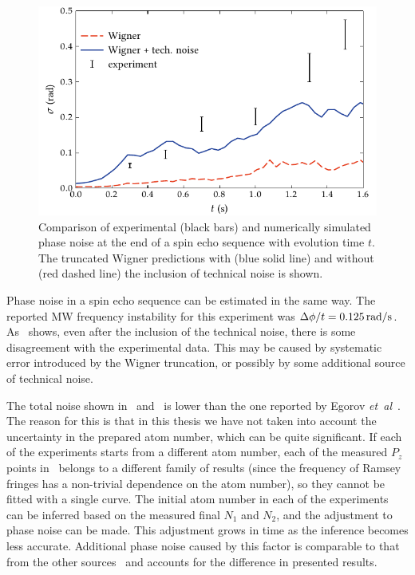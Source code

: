 \begin{figure}
    \centerline{\includegraphics{figures_generated/bec_noise/echo_noise.pdf}}

    \caption[Experimental and numerically simulated phase noise in spin echo sequence]{
    Comparison of experimental (black bars) and numerically simulated phase noise at the end of a spin echo sequence with evolution time $t$.
    The truncated Wigner predictions with (blue solid line) and without (red dashed line) the inclusion of technical noise is shown.}%

    \label{fig:bec-noise:phase-noise:echo-phnoise}
\end{figure}

Phase noise in a spin echo sequence can be estimated in the same way.
The reported MW frequency instability for this experiment was $\Delta \phi / t = 0.125\mbox{\ensuremath{\,\mathrm{rad/s}}}$.
As~ shows, even after the inclusion of the technical noise, there is some disagreement with the experimental data.
This may be caused by systematic error introduced by the Wigner truncation, or possibly by some additional source of technical noise.

The total noise shown in~ and~ is lower than the one reported by Egorov \textit{et~al}~\cite{Egorov2011,Egorov2012}.
The reason for this is that in this thesis we have not taken into account the uncertainty in the prepared atom number, which can be quite significant.
If each of the experiments starts from a different atom number, each of the measured $P_z$ points in~ belongs to a different family of results (since the frequency of Ramsey fringes has a non-trivial dependence on the atom number), so they cannot be fitted with a single curve.
The initial atom number in each of the experiments can be inferred based on the measured final $N_1$ and $N_2$, and the adjustment to phase noise can be made.
This adjustment grows in time as the inference becomes less accurate.
Additional phase noise caused by this factor is comparable to that from the other sources~\cite{Egorov2012} and accounts for the difference in presented results.
